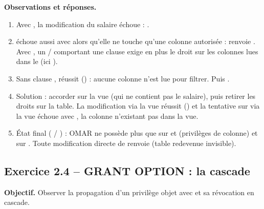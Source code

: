 \textbf{Observations et réponses.}
\begin{enumerate}
  \item Avec , la modification du salaire
        échoue : .
  \item {} échoue aussi avec
         alors qu'elle ne touche qu'une colonne autorisée :
         renvoie . Avec , un
        / comportant une clause  exige en plus le droit
         sur les colonnes lues dans le  (ici ).
  \item Sans clause ,  réussit
        () : aucune colonne n'est lue pour filtrer. Puis .
  \item Solution : accorder  sur la vue 
        (qui ne contient pas le salaire), puis retirer les droits sur la table. La modification via la vue
        réussit () et la tentative sur  via la vue échoue avec
        , la colonne n'existant pas dans la vue.
  \item État final ( / ) : OMAR ne possède plus que
         sur  et  (privilèges de colonne) et
         sur . Toute modification directe de  renvoie
         (table redevenue invisible).
\end{enumerate}


\subsection{Exercice 2.4 -- GRANT OPTION : la cascade}
\textbf{Objectif.} Observer la propagation d'un privilège objet avec  et sa
révocation en cascade.

